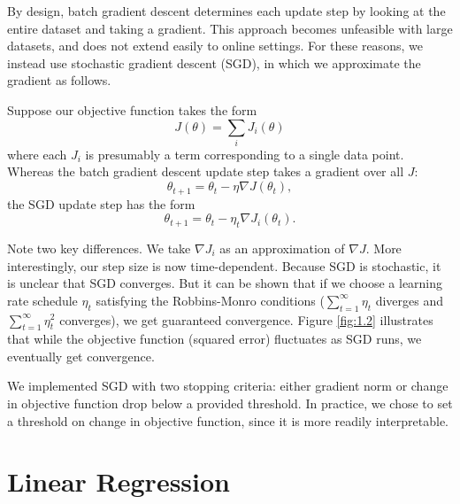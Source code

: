 \documentclass{article}
\begin{document}
\begin{multicols}{2}
By design, batch gradient descent determines each update step by looking at the entire dataset and taking a gradient. This approach becomes unfeasible with large datasets, and does not extend easily to online settings. For these reasons, we instead use stochastic gradient descent (SGD), in which we approximate the gradient as follows.

Suppose our objective function takes the form
\begin{equation}
J(\theta) = \sum_i J_i(\theta)
\end{equation}
where each $J_i$ is presumably a term corresponding to a single data point. Whereas the batch gradient descent update step takes a gradient over all $J$:
\begin{equation}
\theta_{t+1} = \theta_t - \eta \nabla J(\theta_t),
\end{equation}
the SGD update step has the form
\begin{equation} \theta_{t+1} = \theta_t - \eta_t \nabla J_i(\theta_t). \end{equation}

Note two key differences. We take $\nabla J_i$ as an approximation of $\nabla J$. More interestingly, our step size is now time-dependent. Because SGD is stochastic, it is unclear that SGD converges. But it can be shown that if we choose a learning rate schedule $\eta_t$ satisfying the Robbins-Monro conditions ($\sum_{t=1}^\infty \eta_t$ diverges and $\sum_{t=1}^\infty \eta_t^2$ converges), we get guaranteed convergence. Figure \ref{fig:1.2} illustrates that while the objective function (squared error) fluctuates as SGD runs, we eventually get convergence.

We implemented SGD with two stopping criteria: either gradient norm or change in objective function drop below a provided threshold. In practice, we chose to set a threshold on change in objective function, since it is more readily interpretable.





\section{Linear Regression}


\end{multicols}
\end{document}
